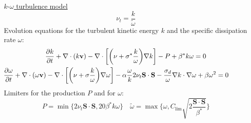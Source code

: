 \documentclass{beamer}
\begin{document}
\begin{frame}[label=ko]{\hyperlink{koSupp}{$k\text{-}\omega$ turbulence model}}
\begin{equation*}
\nu_t = \frac{k}{\tilde{\omega}}
\end{equation*}
Evolution equations for the turbulent kinetic energy $k$ and the specific 
dissipation 
rate $\omega$:
\begin{gather*}
\frac{\partial k}{\partial t} + \nabla \cdot (k\mathbf{v}) - \nabla \cdot
\bigg[\bigg(\nu + \sigma^*\frac{k}{\omega}\bigg) \nabla k\bigg] -P + \beta^* k 
\omega = 0\\ \hspace{-1cm}
\frac{\partial \omega}{\partial t} + \nabla \cdot (\omega \mathbf{v}) - 
\nabla \cdot \bigg[ \bigg( \nu + \sigma \frac{k}{\omega} \bigg) \nabla \omega 
\bigg] - \alpha \frac{\omega}{k} 2 \nu_t \mathbf{S} \cdot \mathbf{S} 
-\frac{\sigma_d}{\omega} \nabla k \cdot 
\nabla \omega+ \beta \omega^2 = 0
\end{gather*}
Limiters for the production $P$ and for $\omega$:
\begin{equation*}
P = \min \{ 2 \nu_t \mathbf{S} \cdot \mathbf{S}, 20 \beta^* k \omega \} \quad 
\tilde{\omega} = \max \Bigg\{ \omega, C_\text{lim} \sqrt{ 
2\frac{\mathbf{S}\cdot\mathbf{S}}{\beta^*}} \Bigg\}
\end{equation*}
\end{frame}
\end{document}
